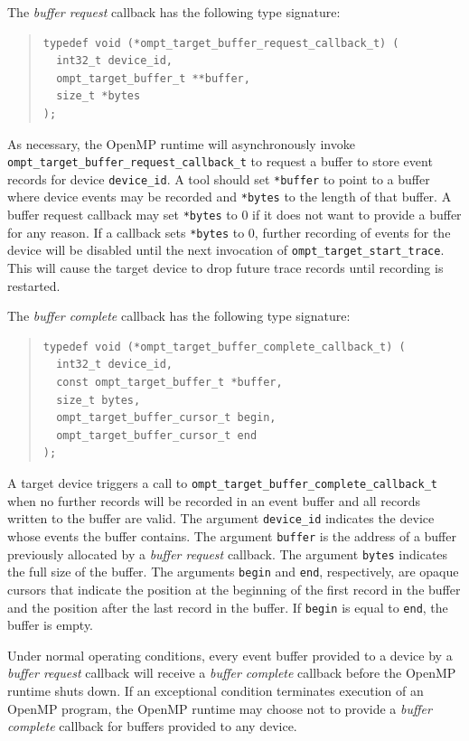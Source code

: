 \documentclass{article}
\begin{document}
The \emph{buffer request} callback has the following type signature:
\begin{quote}
\begin{verbatim}
typedef void (*ompt_target_buffer_request_callback_t) (
  int32_t device_id,
  ompt_target_buffer_t **buffer,
  size_t *bytes
);
\end{verbatim}
\end{quote}
As necessary, the OpenMP runtime will asynchronously invoke \verb|ompt_target_buffer_request_callback_t| to request a buffer to store event records for device \verb|device_id|.
A tool should set \verb|*buffer| to point to a buffer where device events may be recorded and \verb|*bytes| to the length of that buffer.
A buffer request callback  may set \verb|*bytes| to 0 if it does not want to provide a buffer for any reason. If a callback sets \verb|*bytes| to 0, further recording of events for the device will be disabled until the next invocation of \verb|ompt_target_start_trace|. This will cause the target device to drop future trace records until recording is restarted.

The \emph{buffer complete} callback has the following type signature: 
\begin{quote}
\begin{verbatim}
typedef void (*ompt_target_buffer_complete_callback_t) (
  int32_t device_id, 
  const ompt_target_buffer_t *buffer,
  size_t bytes,
  ompt_target_buffer_cursor_t begin,
  ompt_target_buffer_cursor_t end
);
\end{verbatim}
\end{quote}
A target device triggers a call to \verb|ompt_target_buffer_complete_callback_t| when no further records will be recorded in an event buffer and all records written to the buffer are valid. 
The argument \verb|device_id| indicates the device whose events the buffer contains. The argument \verb|buffer| is the address of a buffer previously allocated by a \emph{buffer request} callback. The argument \verb|bytes| indicates the full size of the buffer. The arguments \verb|begin| and \verb|end|, respectively, are opaque cursors that indicate the position at the beginning of the first record in the buffer and the position after the last record in the buffer. If \verb|begin| is equal to \verb|end|, the buffer is empty. 

Under normal operating conditions, every event buffer provided to a device by a \emph{buffer request} callback will receive a \emph{buffer complete} callback before the OpenMP runtime shuts down. If an exceptional condition terminates  execution of an OpenMP program, the OpenMP runtime may choose not to provide a \emph{buffer complete} callback for buffers provided to any device.
\end{document}
